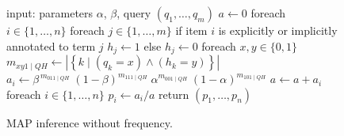 
\begingroup
    \captionsetup[figure]{name=Algorithm}
    \begin{figure}[h]
        \begin{algorithm}[caption={Integer division},label={alg1}]
    input: parameters $\displaystyle\alpha$, $\beta$, query $(q_1, \hdots, q_m)$
    $a \gets 0$
    foreach $i \in \{1, \hdots, n\}$
        foreach $j \in \{1, \hdots, m\}$
            if item $i$ is explicitly or implicitly annotated to term $j$
                $h_j \gets 1$
            else
                $h_j \gets 0$
        foreach $x, y \in \{0, 1\}$
            $m_{xy1 \mid QH} \gets  \left|  \left\{k \mid \left( q_k = x  \right) \wedge  \left( h_k = y \right) \right\} \right|$
        $a_i \gets \beta^{\,m_{011\mid QH}} \;(1 - \beta)^{m_{111\mid QH}} \;\alpha^{m_{001\mid QH}} \;(1 - \alpha)^{m_{101\mid QH}}$
        $a \gets a + a_i$
    foreach $i \in \{1, \hdots, n\}$ 
        $p_i \gets a_i/a$
    return $(p_1, \hdots, p_n)$
        \end{algorithm}
        \caption{MAP inference without frequency.\footnotemark}
    \end{figure}
\endgroup


